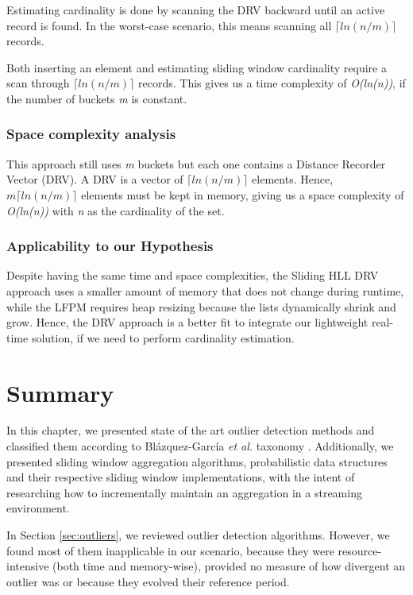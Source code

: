 Estimating cardinality is done by scanning the DRV backward until an active record is found. In the worst-case scenario, this means scanning all \textit{$\lceil ln(n/m) \rceil$} records.

Both inserting an element and estimating sliding window cardinality require a scan through \textit{$\lceil ln(n/m) \rceil$} records. This gives us a time complexity of \textit{O(\textit{ln(n)})}, if the number of buckets \textit{m} is constant. 

\subsubsection*{Space complexity analysis}
This approach still uses \textit{m} buckets but each one contains a Distance Recorder Vector (DRV). A DRV is a vector of \textit{$\lceil ln(n/m) \rceil$} elements. Hence, \textit{$m \lceil ln(n/m) \rceil$} elements must be kept in memory, giving us a space complexity of \textit{O(ln(n))} with \textit{n} as the cardinality of the set.

\subsubsection*{Applicability to our Hypothesis}
Despite having the same time and space complexities, the Sliding HLL DRV approach uses a smaller amount of memory that does not change during runtime, while the LFPM requires heap resizing because the lists dynamically shrink and grow. Hence, the DRV approach is a better fit to integrate our lightweight real-time solution, if we need to perform cardinality estimation.


\section{Summary}
In this chapter, we presented state of the art outlier detection methods and classified them according to Blázquez-García \emph{et al.} taxonomy \cite{Blazquez-Garcia-Review-Anomaly-Detection}. Additionally, we presented sliding window aggregation algorithms, probabilistic data structures and their respective sliding window implementations, with the intent of researching how to incrementally maintain an aggregation in a streaming environment.

In Section \ref{sec:outliers}, we reviewed outlier detection algorithms. However, we found most of them inapplicable in our scenario, because they were resource-intensive (both time and memory-wise), provided no measure of how divergent an outlier was or because they evolved their reference period.


